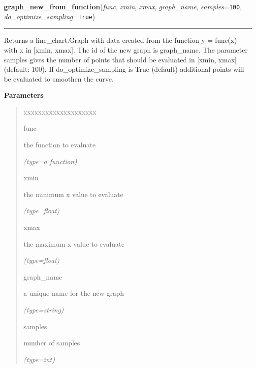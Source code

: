 \hspace{.8\funcindent}\begin{boxedminipage}{\funcwidth}

    \raggedright \textbf{graph\_new\_from\_function}(\textit{func}, \textit{xmin}, \textit{xmax}, \textit{graph\_name}, \textit{samples}={\tt 100}, \textit{do\_optimize\_sampling}={\tt True})

    \vspace{-1.5ex}

    \rule{\textwidth}{0.5\fboxrule}
\setlength{\parskip}{2ex}
    Returns a line\_chart.Graph with data created from the function y = 
    func(x) with x in [xmin, xmax]. The id of the new graph is graph\_name.
    The parameter samples gives the number of points that should be 
    evaluated in [xmin, xmax] (default: 100). If do\_optimize\_sampling is 
    True (default) additional points will be evaluated to smoothen the 
    curve.

\setlength{\parskip}{1ex}
      \textbf{Parameters}
      \vspace{-1ex}

      \begin{quote}
        \begin{Ventry}{xxxxxxxxxxxxxxxxxxxx}

          \item[func]

          the function to evaluate

            {\it (type=a function)}

          \item[xmin]

          the minimum x value to evaluate

            {\it (type=float)}

          \item[xmax]

          the maximum x value to evaluate

            {\it (type=float)}

          \item[graph\_name]

          a unique name for the new graph

            {\it (type=string)}

          \item[samples]

          number of samples

            {\it (type=int)}


\end{Ventry}
\end{quote}
\end{boxedminipage}
